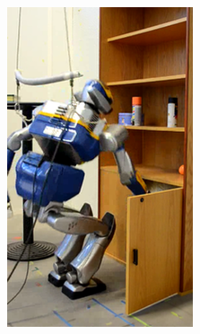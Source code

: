 \begin{figure}
\begin{subfigure}{0.19\columnwidth}
    \includegraphics[width = \columnwidth]
                    {src/chap3-optimal-motion-planning/figure/shelves-3.png}
    \label{shelves-3}
  \end{subfigure}
  \begin{subfigure}{0.19\columnwidth}
    \centering

\end{subfigure}
\end{figure}
